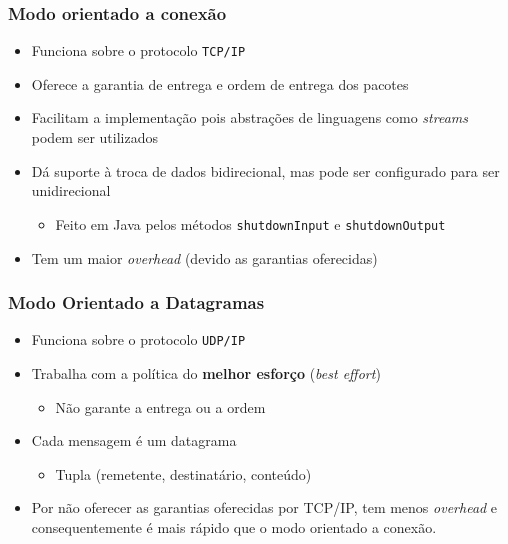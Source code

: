 \documentclass[Ligatures=TeX,table,brazil,svgnames,usetotalslideindicator,comp
ress,10pt]{beamer}
\begin{document}
\begin{frame}
  \frametitle{Modo orientado a conexão}
  \begin{itemize}
    \item Funciona sobre o protocolo \texttt{TCP/IP}
    \item Oferece a garantia de entrega e ordem de entrega dos pacotes
    \item Facilitam a implementação pois abstrações de linguagens como
      \emph{streams} podem ser utilizados
    \item Dá suporte à troca de dados bidirecional, mas pode ser configurado para ser unidirecional
      \begin{itemize}
      \item Feito em Java pelos métodos \texttt{shutdownInput} e \texttt{shutdownOutput}
      \end{itemize}
    \item Tem um maior \emph{overhead} (devido as garantias oferecidas)
  \end{itemize}
\end{frame}

\begin{frame}
  \frametitle{Modo Orientado a Datagramas}
  \begin{itemize}
    \item Funciona sobre o protocolo \texttt{UDP/IP}
    \item Trabalha com a política do \textbf{melhor esforço} (\emph{best effort})
    \begin{itemize}
      \item Não garante a entrega ou a ordem
    \end{itemize}
    \item Cada mensagem é um datagrama
    \begin{itemize}
      \item Tupla (remetente, destinatário, conteúdo)
    \end{itemize}
    \item Por não oferecer as garantias oferecidas por TCP/IP, tem menos
      \emph{overhead} e consequentemente é mais rápido que o modo
      orientado a conexão.
  \end{itemize}

\end{frame}
\end{document}
